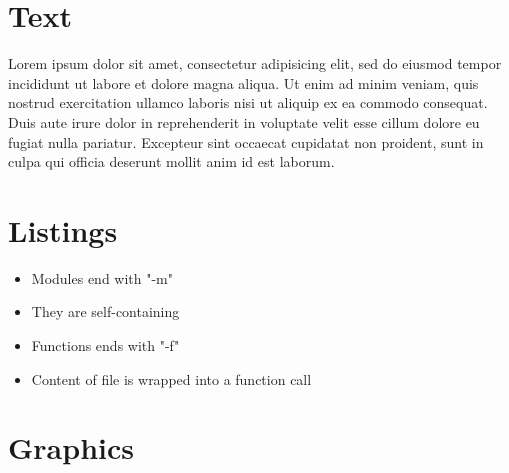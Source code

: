 {
\tableofcontents
}


\section{Text}


{
\begin{multicols}{2}
Lorem ipsum dolor sit amet, consectetur adipisicing elit, sed do eiusmod tempor incididunt ut labore et dolore magna aliqua. Ut enim ad minim veniam, quis nostrud exercitation ullamco laboris nisi ut aliquip ex ea commodo consequat. Duis aute irure dolor in reprehenderit in voluptate velit esse cillum dolore eu fugiat nulla pariatur. Excepteur sint occaecat cupidatat non proident, sunt in culpa qui officia deserunt mollit anim id est laborum.
\end{multicols}
}


\section{Listings}


{
\begin{itemize}
\item Modules end with "-m"
\item They are self-containing
\end{itemize}

}


{
\begin{itemize}
\item Functions ends with "-f"
\item Content of file is wrapped into a function call
\end{itemize}

}


{
\tiny{}
\begin{multicols}{2}

\end{multicols}
}


\section{Graphics}


